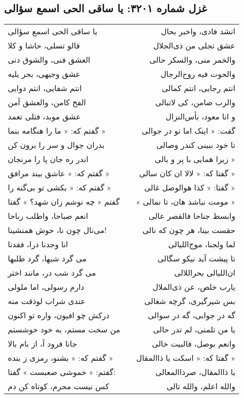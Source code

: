 \begin{center}
\section*{غزل شماره ۳۲۰۱: یا ساقی الحی اسمع سؤالی}
\label{sec:3201}
\begin{longtable}{l p{0.5cm} r}
یا ساقی الحی اسمع سؤالی
&&
انشد فادی، واخبر بحال
\\
قالو تسلی، حاشا و کلا
&&
عشق تجلی من ذی‌الجلال
\\
العشق فنی، والشوق دنی
&&
والخمر منی، والسکر حالی
\\
عشق وجیهی، بحر یلیه
&&
والحوت فیه روح‌الرجال
\\
انتم شفایی، انتم دوایی
&&
انتم رجایی، انتم کمالی
\\
الفخ کامن، والعشق آمن
&&
والرب ضامن، کی لاتبالی
\\
عشق موبد، فتلی تعمد
&&
و انا معود، بأس‌النزال
\\
گفتم که: « ما را هنگامه بنما »
&&
گفت: « اینک اما تو در جوالی
\\
بدران جوال و سر را برون کن
&&
تا خود ببینی کندر وصالی
\\
اندر ره جان پا را مرنجان
&&
زیرا همایی با پر و بالی »
\\
گفتم که: « عاشق بیند مرافق »
&&
گفتا که: « لالا ان کان سالی »
\\
گفتم که: « بکشی تو بی‌گنه را »
&&
گفتا: « کذا هوالوصل غالی »
\\
گفتم « چه نوشم زان شهد؟ » گفتا
&&
« مومت نباشد هان، تا نمالی »
\\
انعم صباحا، واطلب رباحا
&&
وابسط جناحا فالقصر عالی
\\
می‌نال چون نا، خوش همنشینا!
&&
حقست بینا، هر چون که نالی
\\
انا وجدنا درا، فقدنا
&&
لما ولجنا، موج‌اللیالی
\\
می گرد شبها، گرد طلبها
&&
تا پیشت آید نیکو سگالی
\\
می گرد شب در، مانند اختر
&&
ان‌اللیالی بحراللالی
\\
دارم رسولی، اما ملولی
&&
یارب خلص، عن ذی‌الملال
\\
عندی شراب لوذقت منه
&&
بس شیرگیری، گرچه شغالی
\\
درکش چو افیون، واره تو اکنون
&&
گه در جوابی، گه در سوالی
\\
من سخت مستم، به خود خوشستم
&&
یا من تلمنی، لم تدر حالی
\\
جانا فرود آ، از بام بالا
&&
وانعم بوصل، فالبیت خالی
\\
گفتم که: « بشنو، رمزی ز بنده »
&&
گفتا که: « اسکت یا ذاالمقال »
\\
گفتم: « خموشی صعبست » گفتا:
&&
یا ذاالمقال، صرذاالمعالی
\\
کس نیست محرم، کوتاه کن دم
&&
والله اعلم، والله تالی
\\
\end{longtable}
\end{center}
